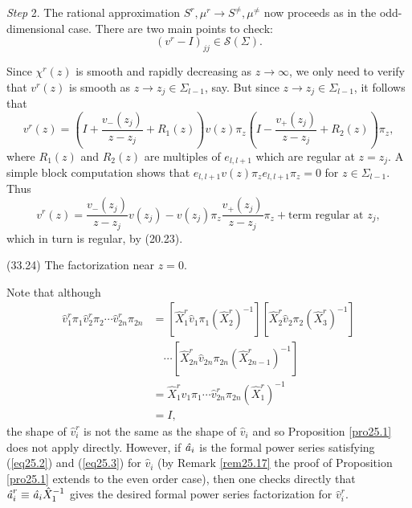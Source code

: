 \documentclass{surv-l}
\theoremstyle{plain}
\theoremstyle{definition}
\numberwithin{equation}{chapter}
\begin{document}
\emph{Step} 2. The rational approximation $S^{r},\mu^{r}\rightarrow S^{\neq}, \mu^{\neq}$ now proceeds as in the odd-dimensional case. There are two main points to check:
\begin{equation}\label{eq33.23}
(v^{r}-I)_{jj}\in\mathscr{S}(\Sigma).
\end{equation}


Since $\chi^{r}(z)$ is smooth and rapidly decreasing as $ z\rightarrow\infty$, we only need to verify that $v^{r}(z)$ is smooth as $z\rightarrow z_{j}\in\Sigma_{l-1}$, say. But since $z\rightarrow z_{j}\in\Sigma_{l-1}$, it follows that
\begin{equation*}
v^{r}(z)=\left(I+\frac{v_{-}(z_{j})}{z-z_{j}}+R_{1}(z)\right)v(z)\pi_{z}\left(I-\frac{v_{+}(z_{j})}{z-z_{j}}+R_{2}(z)\right)\pi_{z},
\end{equation*}
where $R_{1}(z)$ and $R_{2}(z)$ are multiples of $e_{l,l+1}$ which are regular at $z=z_{j}$. A simple block computation shows that $e_{l,l+1}v(z)\pi_{z}e_{l,l+1}\pi_{z}=0$ for $z\in\Sigma_{l-1}$.\\
Thus
\begin{equation*}
v^{r}(z)=\displaystyle \frac{v_{-}(z_{j})}{z-z_{j}}v(z_{j})-v(z_{j})\pi_{z}\frac{v_{+}(z_{j})}{z-z_{j}}\pi_{z}+ \text{term regular at } z_{j},
\end{equation*}
which in turn is regular, by (20.23).

(33.24) The factorization near $z=0$.

Note that although
\begin{align*}
\hat{v}_{1}^{r}\pi_{1}\hat{v}_{2}^{r}\pi_{2}\cdots \hat{v}_{2n}^{r}\pi_{2n}&=[\hat{X}_{1}^{r}\hat{v}_{1}\pi_{1}(\hat{X}_{2}^{r})^{-1}][\hat{X}_{2}^{r}\hat{v}_{2}\pi_{2}(\hat{X}_{3}^{r})^{-1}]\\
&\quad\cdots[\hat{X}_{2n}^{r}\hat{v}_{2n}\pi_{2n}(\hat{X}_{2n-1}^{r})^{-1}]\\ \nonumber
&=\hat{X}_{1}^{r}\hat{v}_{1}\pi_{1}\cdots\hat{v}_{2n}^{r}\pi_{2n}(\hat{X}_{1}^{r})^{-1}\\ \nonumber
&=I, \nonumber
\end{align*}
the shape of $\hat{v}_{i}^{r}$ is not the same as the shape of $\hat{v}_{i}$ and so Proposition \ref{pro25.1} does not apply directly. However, if $\text{\emph{\^{a}}}_{i}$ is the formal power series satisfying (\ref{eq25.2}) and (\ref{eq25.3}) for $\hat{v}_{i}$ (by Remark \ref{rem25.17} the proof of Proposition \ref{pro25.1} extends to the even order case), then one checks directly that $\text{\emph{\^{a}}}_{i}^{r}\equiv\text{\emph{\^{a}}}_{i}\hat{X}_{1}^{-1}$ gives the desired formal power series factorization for $\hat{v}_{i}^{r}$.
\end{document}
